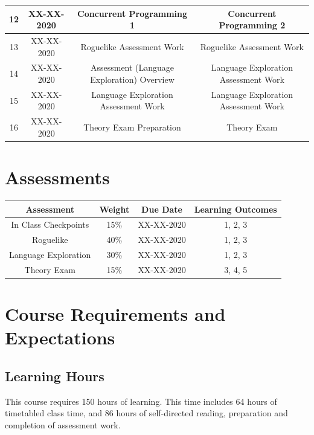 \documentclass{article}
\begin{document}
\begin{tabular}{|c|c|c|c|}
	12            & XX-XX-2020    & Concurrent Programming 1                    & Concurrent Programming 2             \\ \hline
	13            & XX-XX-2020    & Roguelike Assessment Work                   & Roguelike Assessment Work            \\ \hline
	14            & XX-XX-2020    & Assessment (Language Exploration) Overview  & Language Exploration Assessment Work \\ \hline
	15            & XX-XX-2020    & Language Exploration Assessment Work        & Language Exploration Assessment Work \\ \hline
	16            & XX-XX-2020    & Theory Exam Preparation                     & Theory Exam                          \\ \hline
\end{tabular}

\section*{Assessments}
\renewcommand{\arraystretch}{1.5}
\begin{tabular}{|c|c|c|c|}
	\hline
	\textbf{Assessment}  & \textbf{Weight} & \textbf{Due Date} & \textbf{Learning Outcomes} \\ \hline
	In Class Checkpoints & 15\%            & XX-XX-2020        & 1, 2, 3                    \\ \hline
	Roguelike            & 40\%            & XX-XX-2020        & 1, 2, 3                    \\ \hline
	Language Exploration & 30\%            & XX-XX-2020        & 1, 2, 3                    \\ \hline
	Theory Exam          & 15\%            & XX-XX-2020        & 3, 4, 5                    \\ \hline
\end{tabular}

\section*{Course Requirements and Expectations}

\subsection*{Learning Hours}
This course requires 150 hours of learning. This time includes 64 hours of timetabled class time, and 86 hours of self-directed reading, preparation and completion of assessment work.
\end{document}

